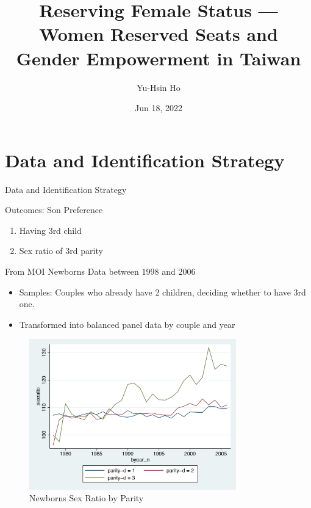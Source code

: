 \documentclass[
  10pt,
  ignorenonframetext,
  aspectratio=43,
]{beamer}
\title{Reserving Female Status --- Women Reserved Seats and Gender
Empowerment in Taiwan}
\author{Yu-Hsin Ho}
\date{Jun 18, 2022}
\institute{Department of Economics, National Taiwan University}
\providecommand{\tightlist}{%
  \setlength{\itemsep}{0pt}\setlength{\parskip}{0pt}}
\begin{document}
\frame{\titlepage}

\hypertarget{data-and-identification-strategy}{%
\section{Data and Identification
Strategy}\label{data-and-identification-strategy}}

\begin{frame}{Data and Identification Strategy}
\begin{block}{Outcomes: Son Preference}
\protect\hypertarget{outcomes-son-preference}{}
\begin{enumerate}
\tightlist
\item
  Having 3rd child
\item
  Sex ratio of 3rd parity
\end{enumerate}

From MOI Newborns Data between 1998 and 2006

\begin{itemize}
\tightlist
\item
  Samples: Couples who already have 2 children, deciding whether to have
  3rd one.
\item
  Transformed into balanced panel data by couple and year
\end{itemize}
\end{block}
\end{frame}

\begin{frame}
\begin{figure}
\centering
\includegraphics[width=0.8\textwidth,height=\textheight]{graphs/sexratioByParity.png}
\caption{Newborns Sex Ratio by Parity}
\end{figure}
\end{frame}
\end{document}
